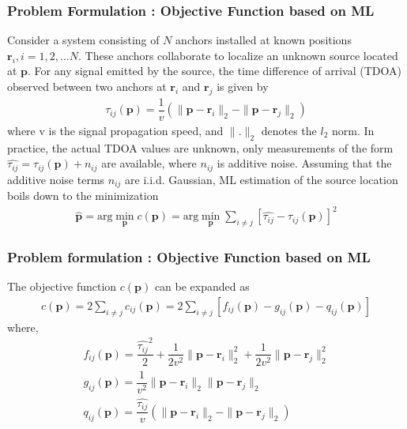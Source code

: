 \documentclass{beamer}
\providecommand{\sbrak}[1]{\ensuremath{{}\left[#1\right]}}
\begin{document}
\begin{frame}
\frametitle{Problem Formulation : Objective Function based on ML}
Consider a system consisting of $N$ anchors installed at known positions $\bm{r}_{i}, i=1,2,\dots N$. These anchors collaborate to localize an unknown source located at $\bm{p}$. For any signal emitted by the source, the time difference of arrival (TDOA) observed between two anchors at $\bm{r}_{i}$ and $\bm{r}_{j}$ is given by
\begin{align}
\label{eq:1}
    \tau_{ij}(\bm{p})=\dfrac{1}{v}(\|\bm{p}-\bm{r}_{i}\|_{2}-\|\bm{p}-\bm{r}_{j}\|_{2})
\end{align}
where v is the signal propagation speed, and $\|.\|_{2}$ denotes the $l_{2}$ norm. In practice, the actual TDOA values are unknown, only measurements of the form $\widehat{\tau_{ij}}=\tau_{ij}(\bm{p})+n_{ij}$ are available, where $n_{ij}$ is additive noise. Assuming that the additive noise terms $n_{ij}$ are i.i.d. Gaussian, ML estimation of the source location boils down to the minimization
\begin{align}
    \widehat{\bm{p}}=\text{arg}\min_{\bm{p}} c(\bm{p})=\text{arg}\min_{\bm{p}}\displaystyle \sum_{i\neq j}\sbrak{\widehat{\tau_{ij}}-\tau_{ij}(\bm{p})}^{2}
\end{align}
\end{frame}

\begin{frame}
\frametitle{Problem formulation : Objective Function based on ML}
The objective function $c(\bm{p})$ can be expanded as
\begin{align}
    c(\bm{p})=2\displaystyle \sum_{i\neq j}c_{ij}(\bm{p})=2\displaystyle \sum_{i\neq j}\sbrak{f_{ij}(\bm{p})-g_{ij}(\bm{p})-q_{ij}(\bm{p})}
\end{align}
where,
\begin{align}
    f_{ij}(\bm{p})=\dfrac{\widehat{\tau_{ij}}^{2}}{2}+\dfrac{1}{2v^{2}}\|\bm{p}-\bm{r}_{i}\|_{2}^{2}+\dfrac{1}{2v^{2}}\|\bm{p}-\bm{r}_{j}\|_{2}^{2}\\
    g_{ij}(\bm{p})=\dfrac{1}{v^{2}}\|\bm{p}-\bm{r}_{i}\|_{2}\|\bm{p}-\bm{r}_{j}\|_{2}\\
    q_{ij}(\bm{p})=\dfrac{\widehat{\tau_{ij}}}{v}(\|\bm{p}-\bm{r}_{i}\|_{2}-\|\bm{p}-\bm{r}_{j}\|_{2})
\end{align}
\end{frame}
 
\end{document}
